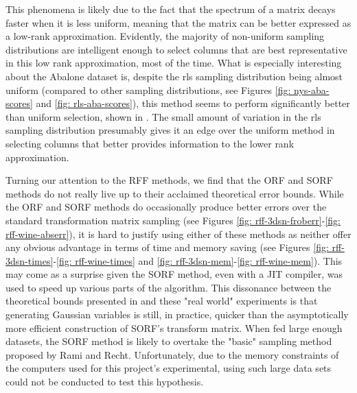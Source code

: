 This phenomena is likely due to the fact that the spectrum of a matrix decays faster when it is less uniform, meaning that the matrix can be better expressed as a low-rank approximation. Evidently, the majority of non-uniform sampling distributions are intelligent enough to select columns that are best representative in this low rank approximation, most of the time. What is especially interesting about the Abalone dataset is, despite the rls sampling distribution being almost uniform (compared to other sampling distributions, see Figures \ref{fig: nys-aba-scores} and \ref{fig: rls-aba-scores}), this method seems to perform significantly better than uniform selection, shown in . The small amount of variation in the rls sampling distribution presumably gives it an edge over the uniform method in selecting columns that better provides information to the lower rank approximation.

Turning our attention to the RFF methods, we find that the ORF and SORF methods do not really live up to their acclaimed theoretical error bounds. While the ORF and SORF methods do occasionally produce better errors over the standard transformation matrix sampling (see Figures \ref{fig: rff-3dsn-froberr}-\ref{fig: rff-wine-abserr}), it is hard to justify using either of these methods as neither offer any obvious advantage in terms of time and memory saving (see Figures \ref{fig: rff-3dsn-times}-\ref{fig: rff-wine-times} and \ref{fig: rff-3dsn-mem}-\ref{fig: rff-wine-mem}). This may come as a surprise given the SORF method, even with a JIT compiler, was used to speed up various parts of the algorithm. This dissonance between the theoretical bounds presented in  and these "real world" experiments is that generating Gaussian variables is still, in practice, quicker than the asymptotically more efficient construction of SORF's transform matrix. When fed large enough datasets, the SORF method is likely to overtake the "basic" sampling method proposed by Rami and Recht. Unfortunately, due to the memory constraints of the computers used for this project's experimental, using such large data sets could not be conducted to test this hypothesis.

